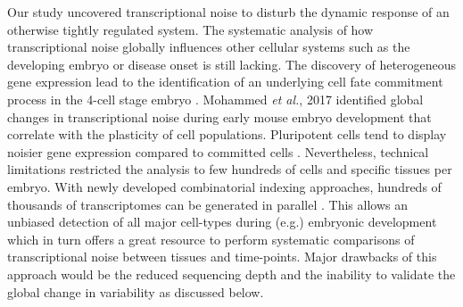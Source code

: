 Our study uncovered transcriptional noise to disturb the dynamic response of an otherwise tightly regulated system. The systematic analysis of how transcriptional noise globally influences other cellular systems such as the developing embryo or disease onset is still lacking. The discovery of heterogeneous gene expression lead to the identification of an underlying cell fate commitment process in the 4-cell stage embryo \citep{Goolam2016}. Mohammed \emph{et al.}, 2017 identified global changes in transcriptional noise during early mouse embryo development that correlate with the plasticity of cell populations. Pluripotent cells tend to display noisier gene expression compared to committed cells \citep{Mohammed2017}. Nevertheless, technical limitations restricted the analysis to few hundreds of cells and specific tissues per embryo. With newly developed combinatorial indexing approaches, hundreds of thousands of transcriptomes can be generated in parallel \citep{Cao2017}. This allows an unbiased detection of all major cell-types during (e.g.) embryonic development which in turn offers a great resource to perform systematic comparisons of transcriptional noise between tissues and time-points. Major drawbacks of this approach would be the reduced sequencing depth and the inability to validate the global change in variability as discussed below.\\


